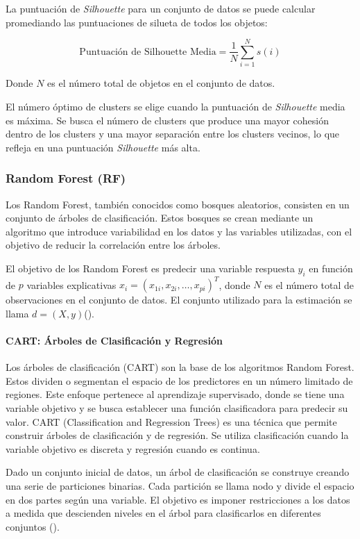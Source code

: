La puntuación de \textit{Silhouette} para un conjunto de datos se puede calcular promediando las puntuaciones de silueta de todos los objetos:

\[ \text{Puntuación de Silhouette Media} = \frac{1}{N} \sum_{i=1}^{N} s(i) \]

Donde \(N\) es el número total de objetos en el conjunto de datos.

El número óptimo de clusters se elige cuando la puntuación de \textit{Silhouette} media es máxima. Se busca el número de clusters que produce una mayor cohesión dentro de los clusters y una mayor
separación entre los clusters vecinos, lo que refleja en una puntuación \textit{Silhouette} más alta.


\subsubsection{Random Forest (RF)}\label{sec:rf}

Los Random Forest, también conocidos como bosques aleatorios, consisten en un conjunto de árboles de clasificación. Estos bosques se crean mediante un algoritmo que introduce variabilidad en los datos y las variables utilizadas, con el objetivo de reducir la correlación entre los árboles.

El objetivo de los Random Forest es predecir una variable respuesta \(y_i\) en función de \(p\) variables explicativas \(x_i = (x_{1i}, x_{2i}, \ldots, x_{pi})^T\), donde \(N\) es el número total de observaciones en el conjunto de datos. El conjunto utilizado para la estimación se llama \(d = (X, y)\)(\cite{ho1995random}).


\paragraph{CART: Árboles de Clasificación y Regresión}
Los árboles de clasificación (CART) son la base de los algoritmos Random Forest. Estos dividen o segmentan el espacio de los predictores en un número limitado de regiones. Este enfoque pertenece al aprendizaje supervisado, donde se tiene una variable objetivo y se busca establecer una función clasificadora para predecir su valor. CART (Classification and Regression Trees) es una técnica que permite construir árboles de clasificación y de regresión. Se utiliza clasificación cuando la variable objetivo es discreta y regresión cuando es continua.

Dado un conjunto inicial de datos, un árbol de clasificación se construye creando una serie de particiones binarias. Cada partición se llama nodo y divide el espacio en dos partes según una variable. El objetivo es imponer restricciones a los datos a medida que descienden niveles en el árbol para clasificarlos en diferentes conjuntos (\cite{wu2008top}).

